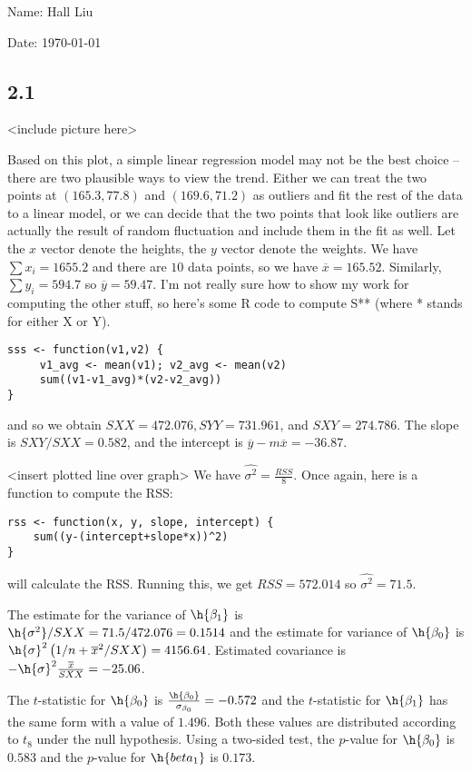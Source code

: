 \documentclass{article}
\newcommand{\conj}{\overline}
\begin{document}
Name: Hall Liu

Date: \today 
\vspace{1.5cm}

\subsection*{2.1}
<include picture here>

Based on this plot, a simple linear regression model may not be the best choice -- there are two plausible ways to view the trend. Either we can treat the two points at $(165.3,77.8)$ and $(169.6,71.2)$ as outliers and fit the rest of the data to a linear model, or we can decide that the two points that look like outliers are actually the result of random fluctuation and include them in the fit as well.
Let the $x$ vector denote the heights, the $y$ vector denote the weights. We have $\sum x_i=1655.2$ and there are $10$ data points, so we have $\conj{x}=165.52$. Similarly, $\sum y_i=594.7$ so $\conj{y}=59.47$. I'm not really sure how to show my work for computing the other stuff, so here's some R code to compute S** (where * stands for either X or Y).
\begin{verbatim}
sss <- function(v1,v2) {
     v1_avg <- mean(v1); v2_avg <- mean(v2)
     sum((v1-v1_avg)*(v2-v2_avg))
}
\end{verbatim}

and so we obtain $SXX=472.076,SYY=731.961$, and $SXY=274.786$.
The slope is $SXY/SXX=0.582$, and the intercept is $\conj{y}-m\conj{x}=-36.87$. 

<insert plotted line over graph>
We have $\widehat{\sigma^2}=\frac{RSS}{8}$. Once again, here is a function to compute the RSS:
\begin{verbatim}
rss <- function(x, y, slope, intercept) {
    sum((y-(intercept+slope*x))^2)
}
\end{verbatim}
will calculate the RSS. Running this, we get $RSS=572.014$ so $\widehat{\sigma^2}=71.5$.

The estimate for the variance of $\h{\beta_1}$ is $\h{\sigma^2}/SXX=71.5/472.076=0.1514$ and the estimate for variance of $\h{\beta_0}$ is $\h{\sigma}^2\left(1/n+\conj{x}^2/SXX\right)=4156.64$. Estimated covariance is $-\h{\sigma}^2\frac{\conj{x}}{SXX}=-25.06$.

The $t$-statistic for $\h{\beta_0}$ is $\frac{\h{\beta_0}}{\sigma_{\beta_0}}=-0.572$ and the $t$-statistic for $\h{\beta_1}$ has the same form with a value of $1.496$. Both these values are distributed according to $t_8$ under the null hypothesis. Using a two-sided test, the $p$-value for $\h{\beta_0}$ is $0.583$ and the $p$-value for $\h{beta_1}$ is $0.173$.
\end{document}
